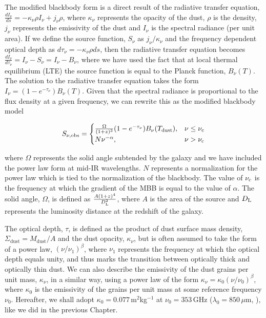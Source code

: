 The modified blackbody form is a direct result of the radiative transfer equation, $\frac{dI_\nu}{ds} = -\kappa_\nu \rho I_\nu + j_\nu \rho$, where $\kappa_\nu$ represents the opacity of the dust, $\rho$ is the density, $j_\nu$ represents the emissivity of the dust and $I_\nu$ is the spectral radiance (per unit area). If we define the source function, $S_\nu$ as $j_\nu/\kappa_\nu$ and the frequency dependent optical depth as $d\tau_\nu = -\kappa_\nu \rho ds$, then the radiative transfer equation becomes $\frac{dI_\nu}{d\tau_\nu} = I_\nu - S_\nu = I_\nu - B_\nu$, where we have used the fact that at local thermal equilibrium (LTE) the source function is equal to the Planck function, $B_\nu(T)$. The solution to the radiative transfer equation takes the form $I_\nu = (1 - e^{-\tau_\nu}) B_\nu(T)$. Given that the spectral radiance is proportional to the flux density at a given frequency, we can rewrite this as the modified blackbody model

\begin{equation}
	S_{\nu, \textrm{obs}} =  
	\begin{cases}
	 	\frac{\Omega}{(1+z)^3} (1- e^{-\tau_\nu}) B_\nu(T_{\textrm{dust}}), & \nu \le \nu_{\rm c} \\
	 	 N \nu^{-\alpha}, & \nu > \nu_{\rm c} \\
	\end{cases}
	\label{eq:modified_blackbody_omega}
\end{equation}

\noindent where $\Omega$ represents the solid angle subtended by the galaxy and we have included the power law form at mid-IR wavelengths. $N$ represents a normalization for the power law which is tied to the normalization of the blackbody. The value of $\nu_{\rm c}$ is the frequency at which the gradient of the MBB is equal to the value of $\alpha$. The solid angle, $\Omega$, is defined as $\frac{A(1+z)^4}{D_{\rm L}^2}$, where $A$ is the area of the source and $D_{\rm L}$ represents the luminosity distance at the redshift of the galaxy. 

The optical depth, $\tau$, is defined as the product of dust surface mass density, $\Sigma_{\textrm{dust}} = M_{\textrm{dust}}/A$ and the dust opacity, $\kappa_\nu$, but is often assumed to take the form of a power law, $(\nu/\nu_1)^\beta$, where $\nu_1$ represents the frequency at which the optical depth equals unity, and thus marks the transition between optically thick and optically thin dust. We can also describe the emissivity of the dust grains per unit mass, $\kappa_\nu$, in a similar way, using a power law of the form $\kappa_\nu = \kappa_0(\nu/\nu_0)^\beta$, where $\kappa_0$ is the emissivity of the grains per unit mass at some reference frequency $\nu_0$. Hereafter, we shall adopt $\kappa_0 = 0.077\,$m$^2$kg$^{-1}$ at $\nu_0 = 353\,$GHz ($\lambda_0 = 850\,\mu$m, \citealt{Dunne_2000, James_2002}), like we did in the previous Chapter.

